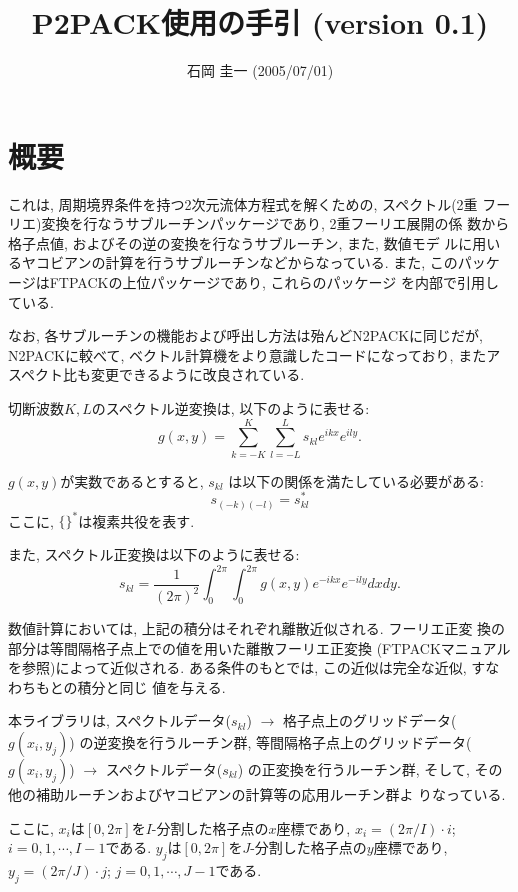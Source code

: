 \documentclass[a4j,fleqn]{jarticle}
\title{P2PACK使用の手引 (version 0.1)}
\author{石岡 圭一  (2005/07/01)}
\date{}
\begin{document}
\maketitle

\section{概要}

これは, 周期境界条件を持つ2次元流体方程式を解くための, スペクトル(2重
フーリエ)変換を行なうサブルーチンパッケージであり, 2重フーリエ展開の係
数から格子点値, およびその逆の変換を行なうサブルーチン, また, 数値モデ
ルに用いるヤコビアンの計算を行うサブルーチンなどからなっている. 
また, このパッケージはFTPACKの上位パッケージであり, これらのパッケージ
を内部で引用している.

なお, 各サブルーチンの機能および呼出し方法は殆んどN2PACKに同じだが,
N2PACKに較べて, ベクトル計算機をより意識したコードになっており,
またアスペクト比も変更できるように改良されている.

切断波数$K,L$のスペクトル逆変換は, 以下のように表せる:
\begin{equation}
g(x,y)=\sum^K_{k=-K}\sum^L_{l=-L}
s_{kl}e^{ikx}e^{ily}.
\end{equation}

$g(x,y)$が実数であるとすると, $s_{kl}$
は以下の関係を満たしている必要がある:
\begin{equation}
s_{(-k)(-l)}=s_{kl}^{*}
\end{equation}
ここに, $\{ \}^{*}$は複素共役を表す.

また, スペクトル正変換は以下のように表せる:
\begin{equation}
s_{kl}=\frac1{(2\pi)^2}\int^{2\pi}_0\int^{2\pi}_0
g(x,y)e^{-ikx}e^{-ily}dxdy.
\end{equation}

数値計算においては, 上記の積分はそれぞれ離散近似される. フーリエ正変
換の部分は等間隔格子点上での値を用いた離散フーリエ正変換
(FTPACKマニュアルを参照)によって近似される.
ある条件のもとでは, この近似は完全な近似, すなわちもとの積分と同じ
値を与える.

本ライブラリは, 
スペクトルデータ($s_{kl}$) 
$\to$ 格子点上のグリッドデータ($g(x_i,y_j)$) 
の逆変換を行うルーチン群,
等間隔格子点上のグリッドデータ($g(x_i,y_j)$) 
$\to$ スペクトルデータ($s_{kl}$) 
の正変換を行うルーチン群, 
そして, その他の補助ルーチンおよびヤコビアンの計算等の応用ルーチン群よ
りなっている.

ここに, $x_i$は$[0,2\pi]$を$I$-分割した格子点の$x$座標であり,
$x_i=(2\pi/I)\cdot i$;  $i=0,1,\cdots,I-1$である.
$y_j$は$[0,2\pi]$を$J$-分割した格子点の$y$座標であり,
$y_j=(2\pi/J)\cdot j$;  $j=0,1,\cdots,J-1$である.
\end{document}
